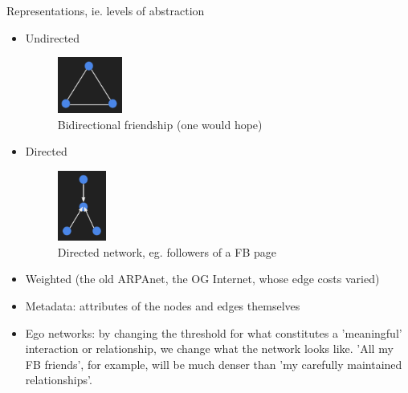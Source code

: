 Representations, ie. levels of abstraction
\begin{itemize}
	\item Undirected
    	\begin{figure}[ht]
    		\begin{center}
      	\includegraphics[width=0.2\textwidth]{figures/Undirected_friends.png}
      	\caption{
        	Bidirectional friendship (one would hope)}
    	\label{fig:figure2}
  			\end{center}
		\end{figure}
    \item Directed
    	\begin{figure}[ht]
    		\begin{center}
      	\includegraphics[width=0.15\textwidth]{figures/Directed_pg_followers.png}
      	\caption{
        	Directed network, eg. followers of a FB page}
    	\label{fig:figure3}
  			\end{center}
		\end{figure}
   \item Weighted (the old ARPAnet, the OG Internet, whose edge costs varied)
   \item Metadata: attributes of the nodes and edges themselves
   \item Ego networks: by changing the threshold for what constitutes a 'meaningful' interaction or relationship, we change what the network looks like. 'All my FB friends', for example, will be much denser than 'my carefully maintained relationships'.  
\end{itemize} 

